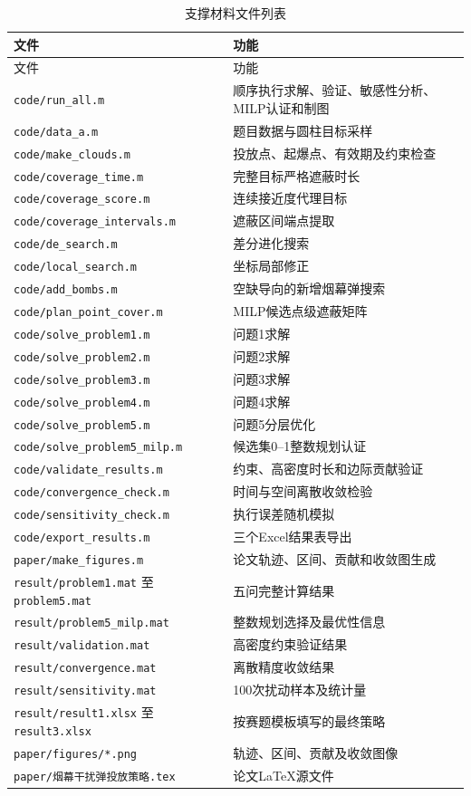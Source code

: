 \documentclass[12pt,a4paper]{ctexart}
\begin{document}
\scriptsize
\renewcommand{\arraystretch}{0.76}
\setlength{\LTpre}{0pt}
\setlength{\LTpost}{0pt}
\begin{longtable}{p{}p{}}
\caption{支撑材料文件列表}\label{tab:support}\\
\toprule
文件 & 功能\\
\midrule
\endfirsthead
\toprule
文件 & 功能\\
\midrule
\endhead
\texttt{code/run\_all.m} & 顺序执行求解、验证、敏感性分析、MILP认证和制图\\
\texttt{code/data\_a.m} & 题目数据与圆柱目标采样\\
\texttt{code/make\_clouds.m} & 投放点、起爆点、有效期及约束检查\\
\texttt{code/coverage\_time.m} & 完整目标严格遮蔽时长\\
\texttt{code/coverage\_score.m} & 连续接近度代理目标\\
\texttt{code/coverage\_intervals.m} & 遮蔽区间端点提取\\
\texttt{code/de\_search.m} & 差分进化搜索\\
\texttt{code/local\_search.m} & 坐标局部修正\\
\texttt{code/add\_bombs.m} & 空缺导向的新增烟幕弹搜索\\
\texttt{code/plan\_point\_cover.m} & MILP候选点级遮蔽矩阵\\
\texttt{code/solve\_problem1.m} & 问题1求解\\
\texttt{code/solve\_problem2.m} & 问题2求解\\
\texttt{code/solve\_problem3.m} & 问题3求解\\
\texttt{code/solve\_problem4.m} & 问题4求解\\
\texttt{code/solve\_problem5.m} & 问题5分层优化\\
\texttt{code/solve\_problem5\_milp.m} & 候选集0--1整数规划认证\\
\texttt{code/validate\_results.m} & 约束、高密度时长和边际贡献验证\\
\texttt{code/convergence\_check.m} & 时间与空间离散收敛检验\\
\texttt{code/sensitivity\_check.m} & 执行误差随机模拟\\
\texttt{code/export\_results.m} & 三个Excel结果表导出\\
\texttt{paper/make\_figures.m} & 论文轨迹、区间、贡献和收敛图生成\\
\texttt{result/problem1.mat} 至 \texttt{problem5.mat} & 五问完整计算结果\\
\texttt{result/problem5\_milp.mat} & 整数规划选择及最优性信息\\
\texttt{result/validation.mat} & 高密度约束验证结果\\
\texttt{result/convergence.mat} & 离散精度收敛结果\\
\texttt{result/sensitivity.mat} & 100次扰动样本及统计量\\
\texttt{result/result1.xlsx} 至 \texttt{result3.xlsx} & 按赛题模板填写的最终策略\\
\texttt{paper/figures/*.png} & 轨迹、区间、贡献及收敛图像\\
\texttt{paper/烟幕干扰弹投放策略.tex} & 论文LaTeX源文件\\
\bottomrule
\end{longtable}
\renewcommand{\arraystretch}{1}
\normalsize
\end{document}
